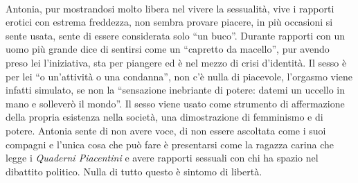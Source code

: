 \paragraph{}Antonia, pur mostrandosi molto libera nel vivere la sessualità, vive i rapporti erotici con estrema freddezza, non sembra provare piacere, in più occasioni si sente usata, sente di essere considerata solo \enquote{un buco}.
Durante rapporti con un uomo più grande dice di sentirsi come un \enquote{capretto da macello}, pur avendo preso lei l'iniziativa, sta per piangere ed è nel mezzo di crisi d'identità.
Il sesso è per lei \enquote{o un'attività o una condanna}, non c'è nulla di piacevole, l'orgasmo viene infatti simulato, se non la \enquote{sensazione inebriante di potere: datemi un uccello in mano e solleverò il mondo}.
Il sesso viene usato come strumento di affermazione della propria esistenza nella società, una dimostrazione di femminismo e di potere.
Antonia sente di non avere voce, di non essere ascoltata come i suoi compagni e l'unica cosa che può fare è presentarsi come la ragazza carina che legge i \textit{Quaderni Piacentini} e avere rapporti sessuali con chi ha spazio nel dibattito politico.
Nulla di tutto questo è sintomo di libertà.



